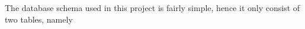 




The database schema used in this project is fairly simple, hence it only consist of two tables, namely \








